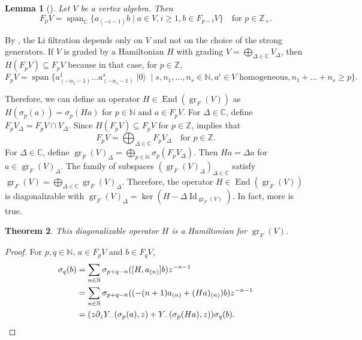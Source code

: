 \documentclass[a4paper, 12pt, reqno]{amsart}
\newtheorem{theorem}{Theorem}[subsection]
\newtheorem{lemma}[theorem]{Lemma}
\theoremstyle{remark}
\numberwithin{equation}{subsection}
\DeclareMathOperator{\Id}{Id}
\DeclareMathOperator{\gr}{gr}
\DeclareMathOperator{\End}{End}
\DeclareMathOperator{\vspan}{span}
\DeclareMathOperator{\vac}{|0\rangle}
\begin{document}
\begin{lemma}[{\cite[Lemma 2.9]{li_abelianizing_2005}}]
  \label{lmm:17}
  Let $V$ be a vertex algebra.
  Then
  \begin{equation*}
    F_pV = \vspan_{\mathbb{C}}\{a_{(-i - 1)}b \mid a \in V, i \ge 1, b \in F_{p - i}V\} \quad \text{for }p \in \mathbb{Z}_+.
  \end{equation*}
\end{lemma}

By , the Li filtration depends only on $V$ and not on the choice of the strong generators.
If $V$ is graded by a Hamiltonian $H$ with grading $V = \bigoplus_{\Delta \in \mathbb{C}}V_{\Delta}$, then $H(F_pV) \subseteq F_pV$ because in that case, for $p \in \mathbb{Z}$,
\begin{equation*}
F_pV =\vspan \{a^1_{(-n_1 - 1)}\dots a^s_{(-n_s - 1)}\vac \mid s, n_1, \dots, n_s \in \mathbb{N}, a^i \in V\text{ homogeneous}, n_1 + \dots + n_s \ge p\}.
\end{equation*}

Therefore, we can define an operator $H \in \End(\gr_F(V))$ as $H(\sigma_p(a)) = \sigma_p(Ha)$ for $p \in \mathbb{N}$ and $a \in F_pV$.
For $\Delta \in \mathbb{C}$, define $F_pV_{\Delta} = F_pV \cap V_{\Delta}$.
Since $H(F_pV) \subseteq F_pV$ for $p \in \mathbb{Z}$,  implies that
\begin{equation}
  \label{eq:39}
  F_pV = \bigoplus_{\Delta \in \mathbb{C}}F_pV_{\Delta} \quad \text{for }p \in \mathbb{Z}.
\end{equation}
For $\Delta\in \mathbb{C}$, define $\gr_F(V)_{\Delta} = \bigoplus_{p \in \mathbb{N}}\sigma_p(F_pV_{\Delta})$.
Then $Ha = \Delta a$ for $a \in \gr_F(V)_{\Delta}$.
The family of subspaces $(\gr_F(V)_{\Delta})_{\Delta \in \mathbb{C}}$ satisfy $\gr_F(V) = \bigoplus_{\Delta \in \mathbb{C}} \gr_F(V)_{\Delta}$.
Therefore, the operator $H \in \End(\gr_F(V))$ is diagonalizable with $\gr_F(V)_{\Delta} = \ker(H - \Delta\Id_{\gr_F(V)})$.
In fact, more is true.
\begin{theorem}
  \label{thr:32}
  This diagonalizable operator $H$ is a Hamiltonian for $\gr_F(V)$.
\end{theorem}

\begin{proof}
  For $p, q \in \mathbb{N}$, $a \in F_pV$ and $b \in F_qV$,
  \begin{align*}
    [H, Y_-(\sigma_p(a), z)]\sigma_q(b) &= \sum_{n \in \mathbb{N}}\sigma_{p + q -n}([H, a_{(n)}]b)z^{-n -1} \\
    &= \sum_{n \in \mathbb{N}}\sigma_{p + q -n}((-(n + 1)a_{(n)} + (Ha)_{(n)})b)z^{-n - 1} \\
    &= (z\partial_zY_-(\sigma_p(a), z) + Y_-(\sigma_p(Ha), z))\sigma_q(b). \qedhere
  \end{align*}
\end{proof}
\end{document}
